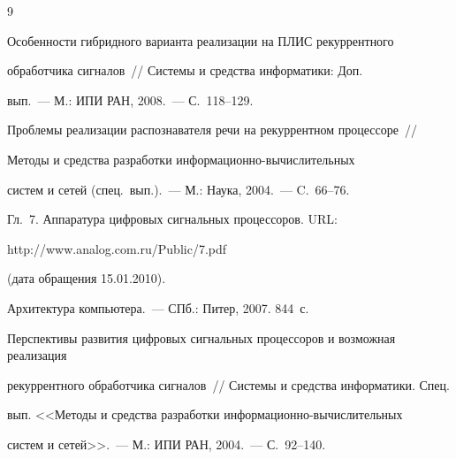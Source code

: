 {\frenchspacing\small




\begin{thebibliography}{9}









Особенности гибридного варианта реализации на ПЛИС рекуррентного 


обработчика сигналов~// Системы и средства информатики: Доп. 


вып.~--- М.: ИПИ РАН, 2008.~--- С.~118--129.









Проблемы реализации распознавателя речи на рекуррентном процессоре~// 


Методы и средства разработки ин\-фор\-ма\-ци\-он\-но-вы\-чис\-ли\-тель\-ных 


систем и сетей (спец.\ вып.).~--- М.: Наука, 2004.~--- C.~66--76.









Гл.~7. Аппаратура цифровых сигнальных процессоров. URL: {\sf 


http://www.analog.com.ru/Public/7.pdf} (дата обращения 15.01.2010).









Архитектура компьютера.~--- СПб.: Питер, 2007.  844~с.









Перспективы развития цифровых сигнальных процессоров и возможная реализация 


рекуррентного обработчика сигналов~// Системы и средства информатики. Спец. 


вып. <<Методы и средства разработки ин\-фор\-ма\-ци\-он\-но-вы\-чис\-ли\-тель\-ных 


систем и сетей>>.~--- М.: ИПИ РАН, 2004.~--- С.~92--140.


\end{thebibliography}


}


